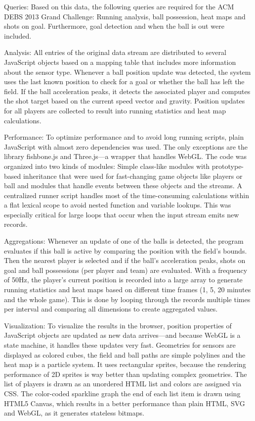 \documentclass{sig-alternate}
\begin{document}
Queries: Based on this data, the following queries are required
for the ACM DEBS 2013 Grand Challenge:
Running analysis, ball possession, heat maps and shots on goal.
Furthermore, goal detection and when the ball is out were included.

Analysis: All entries of the original data stream are distributed
to several JavaScript objects based on a mapping table
that includes more information about the sensor type.
Whenever a ball position update was detected,
the system uses the last known position to check
for a goal or whether the ball has left the field.
If the ball acceleration peaks, it detects the associated player
and computes the shot target
based on the current speed vector and gravity.
Position updates for all players are collected
to result into running statistics and heat map calculations.

Performance: To optimize performance
and to avoid long running scripts,
plain JavaScript with almost zero dependencies was used.
The only exceptions are the library fishbone.js
and Three.js---a wrapper that handles WebGL.
The code was organized into two kinds of modules:
Simple class-like modules with prototype-based inheritance
that were used for fast-changing game objects
like players or ball
and modules that handle events between these objects
and the streams.
A centralized runner script handles
most of the time-consuming calculations within a flat lexical scope
to avoid nested function and variable lookups.
This was especially critical for large loops
that occur when the input stream emits new records.

Aggregations: Whenever an update of one of the balls is detected,
the program evaluates if this ball is active
by comparing the position with the field’s bounds.
Then the nearest player is selected
and if the ball’s acceleration peaks,
shots on goal and ball possessions
(per player and team) are evaluated.
With a frequency of 50Hz, the player’s current position
is recorded into a large array to generate running statistics
and heat maps based on different time frames
(1, 5, 20 minutes and the whole game).
This is done by looping through the records
multiple times per interval
and comparing all dimensions to create aggregated values.

Visualization: To visualize the results in the browser,
position properties of JavaScript objects are updated
as new data arrives---and because WebGL is a state machine,
it handles these updates very fast.
Geometries for sensors are displayed as colored cubes,
the field and ball paths are simple polylines
and the heat map is a particle system.
It uses rectangular sprites, because the rendering performance
of 2D sprites is way better than updating complex geometries.
The list of players is drawn as an unordered HTML list
and colors are assigned via CSS.
The color-coded sparkline graph the end of each list item
is drawn using HTML5 Canvas,
which results in a better performance than plain HTML,
SVG and WebGL, as it generates stateless bitmaps.
\end{document}
